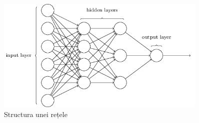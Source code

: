 \begin{figure}[!htbp]
    \begin{center}
        \includegraphics[width=0.9\textwidth]{images/retea.png}
        \caption{Structura unei rețele\cite{Nielsen2015}}
    \end{center}
\end{figure}

